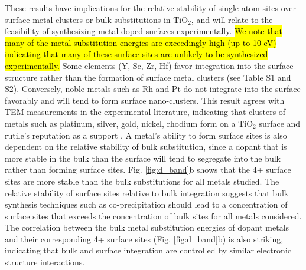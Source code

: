
These results have implications for the relative stability of single-atom sites over surface metal clusters or bulk substitutions in TiO$_2$, and will relate to the feasibility of synthesizing metal-doped surfaces experimentally. \hl{We note that many of the metal substitution energies are exceedingly high (up to 10 eV) indicating that many of these surface sites are unlikely to be synthesized experimentally.} Some elements (Y, Sc, Zr, Hf) favor integration into the surface structure rather than the formation of surface metal clusters (see Table S1 and S2). Conversely, noble metals such as Rh and Pt do not integrate into the surface favorably and will tend to form surface nano-clusters. This result agrees with TEM measurements in the experimental literature, indicating that clusters of metals such as platinum, silver, gold, nickel, rhodium form on a TiO$_2$ surface \cite{Iliev_2006, Dung_Dang_2010, Shinde_2013, Yu_2019} and rutile's reputation as a support \cite{Bagheri_2014}. A metal's ability to form surface sites is also dependent on the relative stability of bulk substitution, since a dopant that is more stable in the bulk than the surface will tend to segregate into the bulk rather than forming surface sites. Fig. \ref{fig:d_band}b shows that the 4+ surface sites are more stable than the bulk substitutions for all metals studied. The relative stability of surface sites relative to bulk integration suggests that bulk synthesis techniques such as co-precipitation should lead to a concentration of surface sites that exceeds the concentration of bulk sites for all metals considered.
The correlation between the bulk metal substitution energies of dopant metals and their corresponding 4+ surface sites (Fig. \ref{fig:d_band}b) is also striking, indicating that bulk and surface integration are controlled by similar electronic structure interactions. %

